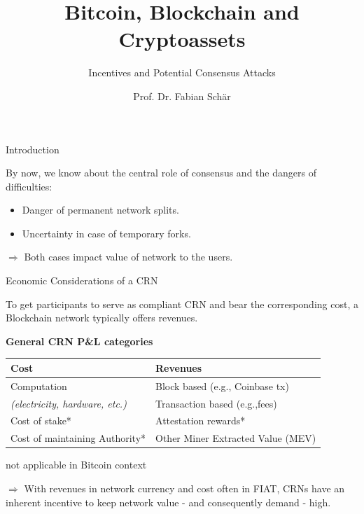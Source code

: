 \documentclass[handout]{beamer}
\title{Bitcoin, Blockchain and Cryptoassets}
\subtitle{Incentives and Potential Consensus Attacks}
\author{Prof. Dr. Fabian Schär}
\institute{University of Basel}
\begin{document}
\thispagestyle{empty}
\begin{frame}[noframenumbering]
	\titlepage
\end{frame}

\begin{frame}{Introduction}

By now, we know about the central role of consensus and the dangers of difficulties:
	\begin{itemize}
		\item Danger of permanent network splits.
		\item Uncertainty in case of temporary forks.
	\end{itemize}
	
\vspace{0.5 em}
$\Rightarrow$ Both cases impact value of network to the users.

\vspace{1.5 em}

\end{frame}

\begin{frame}{Economic Considerations of a CRN}

To get participants to serve as compliant CRN and bear the corresponding cost, a Blockchain network typically offers revenues.

\vspace{1 em}

\footnotesize
\textbf{General CRN P\&L categories}
\begin{table}
	{\renewcommand{\arraystretch}{1.3}%
  \center
  \begin{tabular}[]{p{} | p{}}
		\textbf{Cost} & \textbf{Revenues}      \\
		\hline
		Computation & Block based (e.g., Coinbase tx)\\
		\textit{(electricity, hardware, etc.)} & Transaction based (e.g.,fees)\\
		Cost of stake* & Attestation rewards*\\
		Cost of maintaining Authority* & Other Miner Extracted Value (MEV)
  \end{tabular}}
\end{table}

\scriptsize *not applicable in Bitcoin context

\vspace{1 em}
\normalsize
$\Rightarrow$ With revenues in network currency and cost often in FIAT, CRNs have an inherent incentive to keep network value - and consequently demand - high.
	
\end{frame}
\end{document}
